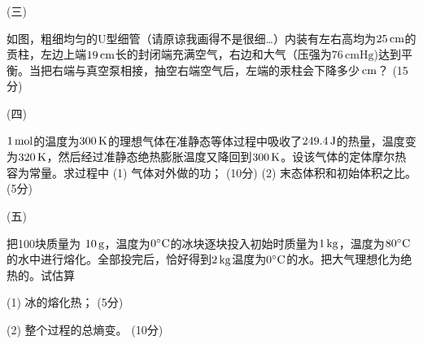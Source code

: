 \documentclass[10pt,CJK]{article}
\def\mark#1{{\color{blue} (#1分)}}
\begin{document}
\item[(三)]{
  如图，粗细均匀的U型细管（请原谅我画得不是很细…）内装有左右高均为$25\,\mathrm{cm}$的贡柱，左边上端$19\,\mathrm{cm}$长的封闭端充满空气，右边和大气（压强为$76\,\mathrm{cmHg}$)达到平衡。当把右端与真空泵相接，抽空右端空气后，左端的汞柱会下降多少$\,\mathrm{cm}$？\mark{15}
    
    
    \vspace{3.5in}

}

\item[(四)]{$1\,\mathrm{mol}$的温度为$300\,\mathrm{K}$的理想气体在准静态等体过程中吸收了$249.4\,\mathrm{J}$的热量，温度变为$320\,\mathrm{K}$，然后经过准静态绝热膨胀温度又降回到$300\,\mathrm{K}$。设该气体的定体摩尔热容为常量。求过程中 (1) 气体对外做的功；\mark{10} (2) 末态体积和初始体积之比。\mark{5}

\vspace{3.5in}}
    
  


\item[(五)]{把100块质量为 $10\,\mathrm{g}$，温度为$0^\circ \mathrm{C}$的冰块逐块投入初始时质量为$1\,\mathrm{kg}$，温度为$80^\circ \mathrm{C}$的水中进行熔化。全部投完后，恰好得到$2\,\mathrm{kg}$温度为$0^\circ \mathrm{C}$的水。把大气理想化为绝热的。试估算
  \bitem
\item[(1)]{冰的熔化热；\mark{5}}
\item[(2)]{整个过程的总熵变。\mark{10}}
  \eitem
    }
  

\eitem



\ech
\end{document}

